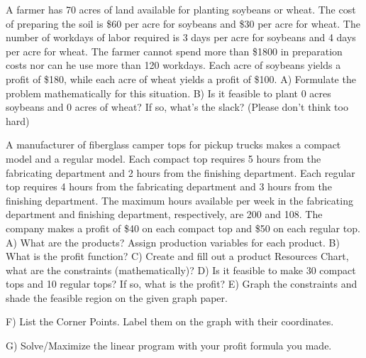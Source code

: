 \documentclass[11pt,epsfig]{article}
\begin{document}
\newpage




\begin{problem}{15}
A farmer has 70 acres of land available for planting soybeans or wheat. The cost of preparing the soil is \$60 per acre for soybeans and \$30 per acre for wheat. The number of workdays of labor required is 3 days per acre for soybeans and 4 days per acre for wheat. The farmer cannot spend more than \$1800 in preparation costs nor can he use more than 120 workdays. Each acre of soybeans yields a profit of \$180, while each acre of wheat yields a profit of \$100.
\newline
A) Formulate the problem mathematically for this situation.
\newline
B) Is it feasible to plant 0 acres soybeans and 0 acres of wheat? If so, what's the slack? (Please don't think too hard)

\vfill
\end{problem}

\newpage

\begin{problem}{55}
A manufacturer of fiberglass camper tops for pickup trucks makes a compact model and a regular model. Each compact top requires 5 hours from the fabricating department and 2 hours from the finishing department. Each regular top requires 4 hours from the fabricating department and 3 hours from the finishing department. The maximum hours available per week in the fabricating department and finishing department, respectively, are 200 and 108. The company makes a profit of \$40 on each compact top and \$50 on each regular top.
\newline
\newline
A) What are the products? Assign production variables for each product.
\vfill
B) What is the profit function?
\vfill
C) Create and fill out a product Resources Chart, what are the constraints (mathematically)?
\vfill
D) Is it feasible to make 30 compact tops and 10 regular tops? If so, what is the profit?
\vfill 
\newpage
E) Graph the constraints and shade the feasible region on the given graph paper.

F) List the Corner Points. Label them on the graph with their coordinates.

G) Solve/Maximize the linear program with your profit formula you made.


\vfill
\end{problem}










\showpoints
\end{document}
